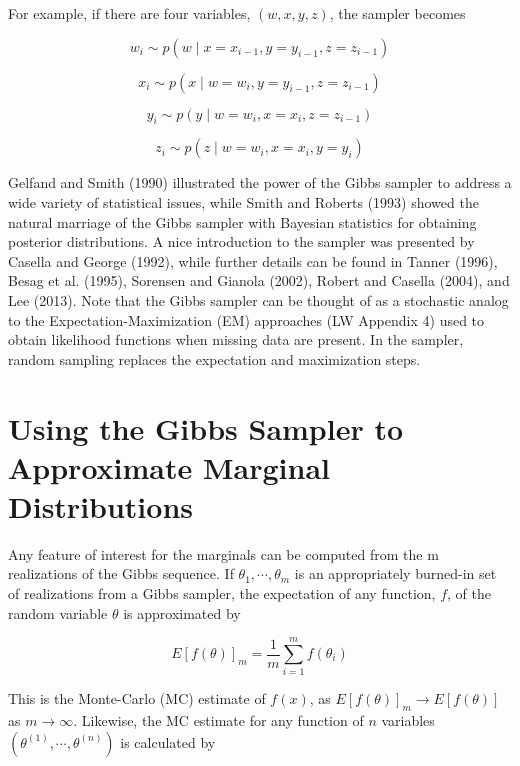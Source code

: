 \documentclass{article}
\begin{document}
For example, if there are four variables,  $ (w, x, y, z) $, the sampler becomes

\begin{equation}
w_{i}\sim p(w\mid x=x_{i-1},y=y_{i-1},z=z_{i-1})
\end{equation}

\begin{equation}
x_{i}\sim p(x\mid w=w_{i},y=y_{i-1},z=z_{i-1})
\end{equation}

\begin{equation}
y_{i}\sim p(y\mid w=w_{i},x=x_{i},z=z_{i-1})
\end{equation}

\begin{equation}
z_{i}\sim p(z\mid w=w_{i},x=x_{i},y=y_{i})
\end{equation}

Gelfand and Smith (1990) illustrated the power of the Gibbs sampler to address a wide variety of statistical issues, while Smith and Roberts (1993) showed the natural marriage of the Gibbs sampler with Bayesian statistics for obtaining posterior distributions. A nice introduction to the sampler was presented by Casella and George (1992), while further details can be found in Tanner (1996), Besag et al. (1995), Sorensen and Gianola (2002), Robert and Casella (2004), and Lee (2013). Note that the Gibbs sampler can be thought of as a stochastic analog to the Expectation-Maximization (EM) approaches (LW Appendix 4) used to obtain likelihood functions when missing data are present. In the sampler, random sampling replaces the expectation and maximization steps.

\section{Using the Gibbs Sampler to Approximate Marginal Distributions}
Any feature of interest for the marginals can be computed from the m realizations of the Gibbs sequence. If  $ \theta_1, \cdots, \theta_m $ is an appropriately burned-in set of realizations from a Gibbs sampler, the expectation of any function,  $ f $, of the random variable  $ \theta $ is approximated by

\begin{equation}
E[f(\theta)]_{m}=\frac{1}{m}\sum_{i=1}^{m}f(\theta_{i})
\end{equation}

This is the Monte-Carlo (MC) estimate of  $ f(x) $, as  $ E[f(\theta)]_m \to E[f(\theta)] $ as  $ m \to \infty $. Likewise, the MC estimate for any function of  $ n $ variables  $ (\theta^{(1)}, \cdots, \theta^{(n)}) $ is calculated by
\end{document}
